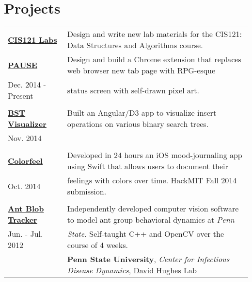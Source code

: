 \documentclass{resume}[10pt, a4paper]
\begin{document}
\section{Projects}
\begin{tabular}{l | l}    
    \textbf{\href{https://github.com/jtcho/CIS121-Labs}{CIS121 Labs}} & Design and write new lab materials for the CIS121: Data Structures and Algorithms course.\\
    \textbf{\href{https://github.com/jtcho/PAUSE}{PAUSE}} & Design and build a Chrome extension that replaces web browser new tab page with RPG-esque\\
            Dec. 2014 - Present&status screen with self-drawn pixel art.\\\\
    \textbf{\href{http://bst.jtcho.me}{BST Visualizer}} & Built an Angular/D3 app to visualize insert operations on various binary search trees.\\
            Nov. 2014 & \\\\
    \textbf{\href{http://jtcho.me/colorfeel}{Colorfeel}}&Developed in 24 hours an iOS mood-journaling app using Swift that allows users to document their\\
            Oct. 2014& feelings with colors over time. HackMIT Fall 2014 submission.\\\\
    \textbf{\href{http://jtcho.me/anttracker}{Ant Blob Tracker}} & Independently developed computer vision software to model ant group behavioral dynamics at \textit{Penn}\\
            Jun. - Jul. 2012&\textit{State.} Self-taught C++ and OpenCV over the course of 4 weeks.\\
                     &\textbf{Penn State University}, \textit{Center for Infectious Disease Dynamics}, \href{http://www.hugheslab.com/}{David Hughes} Lab


\end{tabular}
\end{document}
